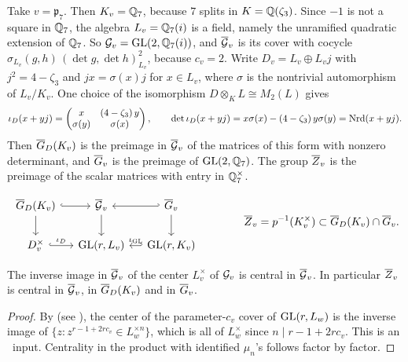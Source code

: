 \begin{example}\label{I:ex:localcovers}
Take $v=\mathfrak p_7$. Then $K_v=\mathbb{Q}_7$, because $7$ splits in $K=\mathbb{Q}(\zeta_3)$. Since $-1$ is not a square in $\mathbb{Q}_7$, the algebra $L_v=\mathbb{Q}_7(i)$ is a field, namely the unramified quadratic extension of $\mathbb{Q}_7$. So $\mathcal{G}_v=\mathrm{GL}(2,\mathbb{Q}_7(i))$, and $\overline{\mathcal{G}}_v$ is its cover with cocycle $\sigma_{L_v}(g,h)\,(\det g,\det h)_{L_v}^{2}$, because $c_v=2$. Write $D_v=L_v\oplus L_vj$ with $j^2=4-\zeta_3$ and $jx=\sigma(x)j$ for $x\in L_v$, where $\sigma$ is the nontrivial automorphism of $L_v/K_v$. One choice of the isomorphism $D\otimes_KL\cong M_2(L)$ gives
\[ \iota_D(x+yj)=\begin{pmatrix}x&(4-\zeta_3)\,y\\ \sigma(y)&\sigma(x)\end{pmatrix},\qquad \det\iota_D(x+yj)=x\sigma(x)-(4-\zeta_3)\,y\sigma(y)=\operatorname{Nrd}(x+yj). \]
Then $\overline{G}_D(K_v)$ is the preimage in $\overline{\mathcal{G}}_v$ of the matrices of this form with nonzero determinant, and $\overline{G}_v$ is the preimage of $\mathrm{GL}(2,\mathbb{Q}_7)$. The group $\overline{Z}_v$ is the preimage of the scalar matrices with entry in $\mathbb{Q}_7^\times$.
\end{example}


\begin{equation}\label{I:eq:diagram}
\begin{tikzcd}[column sep=small]
\GDb(K_v)\arrow[r,hook]\arrow[d] & \cGb_v\arrow[d] & \Gb_v\arrow[l,hook']\arrow[d]\\
D_v^\times\arrow[r,hook,"\iD"] & \GL(r,L_v) & \GL(r,K_v)\arrow[l,hook',"\iG"']
\end{tikzcd}
\qquad\qquad \Zb_v=p^{-1}(K_v^\times)\subset\GDb(K_v)\cap\Gb_v.
\end{equation}

\begin{lemma}\label{I:lem:center}
The inverse image in $\overline{\mathcal{G}}_v$ of the center $L_v^\times$ of $\mathcal{G}_v$ is central in $\overline{\mathcal{G}}_v$. In particular $\overline{Z}_v$ is central in $\overline{\mathcal{G}}_v$, in $\overline{G}_D(K_v)$ and in $\overline{G}_v$.
\end{lemma}
\begin{proof}
By \cite[\S2]{FK86} (see \cite[Lemma~2.1]{JC26a}), the center of the parameter-$c_v$ cover of $\mathrm{GL}(r,L_w)$ is the inverse image of $\{z:z^{r-1+2rc_v}\in L_w^{\times n}\}$, which is all of $L_w^\times$ since $n\mid r-1+2rc_v$. This is an \Ev\ input. Centrality in the product with identified $\mu_n$'s follows factor by factor.
\end{proof}

